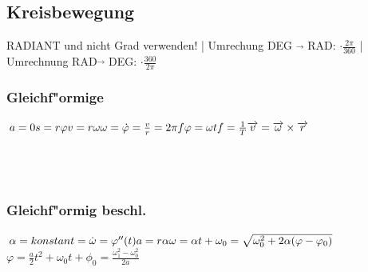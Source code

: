 \subsection{Kreisbewegung}
RADIANT und nicht Grad verwenden! |
Umrechung DEG $\overrightarrow{}$ RAD: $\cdot \frac{2\pi}{360}$ | 
Umrechnung RAD$\overrightarrow{}$ DEG: $\cdot \frac{360}{2\pi}$
\begin{multicols}{3}
	\subsubsection{Gleichf"ormige}
	$a = 0 \\
	s = r\varphi \\
	v = r\omega \\
	\omega = \dot \varphi = \frac{v}{r} = 2\pi f\\
	\varphi = \omega t \\
	f = \frac{1}{T} \\
	\overrightarrow{v} = \overrightarrow{\omega} \times \overrightarrow{r}$ \\
	\\
	\\
	\\
	\columnbreak
\subsubsection{Gleichf"ormig beschl.}
	$\alpha = konstant = \dot \omega = \varphi''(t) \\
	a = r \alpha \\
	\omega = \alpha t + \omega_{0} = \sqrt{\omega_{0}^2 + 2 \alpha(\varphi - \varphi_{0})}$ \\
	$\varphi =\frac{a}{2}t^2 + \omega_{0}t + \phi_{0} = \frac{\omega_{1}^2 -\omega_{0}^2}{2a}$	\\
	\columnbreak

\end{multicols}
